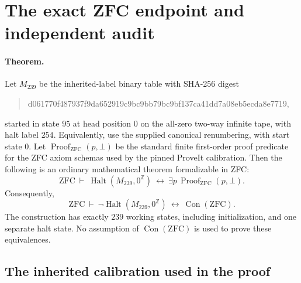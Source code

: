 \section{The exact ZFC endpoint and independent audit}
\label{sec:endpoint239}

\paragraph{Theorem.}
Let $M_{239}$ be the inherited-label binary table with SHA-256 digest
\begin{quote}\small\ttfamily
d061770f487937f9da652919c9bc9bb79bc9bf137ca41dd7a08eb5ecda8e7719,
\end{quote}
started in state $95$ at head position $0$ on the all-zero two-way infinite
tape, with halt label $254$.  Equivalently, use the supplied canonical
renumbering, with start state $0$.  Let
$\operatorname{Proof}_{\mathrm{ZFC}}(p,\bot)$ be the standard finite
first-order proof predicate for the ZFC axiom schemas used by the pinned
ProveIt calibration.  Then the following is an ordinary mathematical
theorem formalizable in ZFC:
\[
 \mathrm{ZFC}\ \vdash\
 \operatorname{Halt}(M_{239},0^\mathbb Z)
 \ \longleftrightarrow\
 \exists p\,\operatorname{Proof}_{\mathrm{ZFC}}(p,\bot).
 \tag{E239}
\]
Consequently,
\[
 \mathrm{ZFC}\ \vdash\
 \neg\operatorname{Halt}(M_{239},0^\mathbb Z)
 \ \longleftrightarrow\
 \operatorname{Con}(\mathrm{ZFC}).
\]
The construction has exactly $239$ working states, including initialization,
and one separate halt state.  No assumption of
$\operatorname{Con}(\mathrm{ZFC})$ is used to prove these equivalences.

\subsection{The inherited calibration used in the proof}

